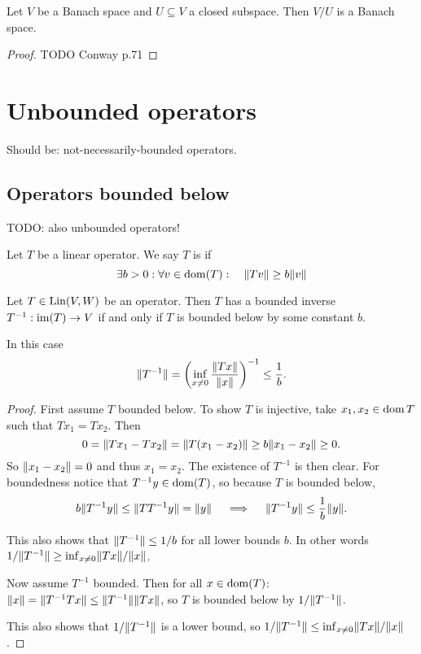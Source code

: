 \begin{proposition} \label{quotientBanachSpace}
Let $V$ be a Banach space and $U\subseteq V$ a closed subspace. Then $V/U$ is a Banach space.
\end{proposition}
\begin{proof}
TODO Conway p.71
\end{proof}

\section{Unbounded operators}
Should be: not-necessarily-bounded operators.
\subsection{Operators bounded below}
TODO: also unbounded operators!
\begin{definition}
Let $T$ be a linear operator. We say $T$ is  if
\[ \exists b>0:\forall v\in \operatorname{dom}(T): \quad \lVert Tv\rVert\geq b\lVert v\rVert \]
\end{definition}

\begin{proposition} \label{boundedBelow}
Let $T\in \operatorname{Lin}(V, W)$ be an operator. Then $T$ has a bounded inverse $T^{-1}: \operatorname{im}(T)\to V$ \textup{if and only if} $T$ is bounded below by some constant $b$.

In this case
\[ \displaystyle\lVert T^{-1}\rVert = \left(\inf_{x\neq 0}\frac{\lVert Tx\rVert}{\lVert x\rVert}\right)^{-1} \leq \frac{1}{b}. \]
\end{proposition}
\begin{proof}
First assume $T$ bounded below.
To show $T$ is injective, take $x_1,x_2\in \operatorname{dom} T$ such that $Tx_1 = Tx_2$. Then
\[ 0 = \lVert Tx_1 - Tx_2\rVert = \lVert T(x_1 - x_2)\rVert \geq b\lVert x_1 - x_2\rVert \geq 0. \]
So $\lVert x_1 - x_2\rVert = 0$ and thus $x_1=x_2$.
The existence of $T^{-1}$ is then clear. For boundedness notice that $T^{-1}y \in \operatorname{dom}(T)$, so because $T$ is bounded below,
\[ b\lVert T^{-1}y\rVert \leq \lVert TT^{-1}y\rVert = \lVert y\rVert \quad\implies\quad \lVert T^{-1}y\rVert \leq \frac{1}{b}\lVert y\rVert. \]

This also shows that $\lVert T^{-1}\rVert \leq 1/b$ for all lower bounds $b$. In other words $1/\lVert T^{-1}\rVert \geq \inf_{x\neq 0}\lVert Tx\rVert/\lVert x\rVert$.

Now assume $T^{-1}$ bounded. Then for all $x\in\operatorname{dom}(T)$: $\lVert x\rVert = \lVert T^{-1}Tx\rVert \leq \lVert T^{-1}\rVert\lVert Tx\rVert$, so $T$ is bounded below by $1/\lVert T^{-1}\rVert$.

This also shows that $1/\lVert T^{-1}\rVert$ is a lower bound, so $1/\lVert T^{-1}\rVert \leq \inf_{x\neq 0}\lVert Tx\rVert/\lVert x\rVert$.
\end{proof}




